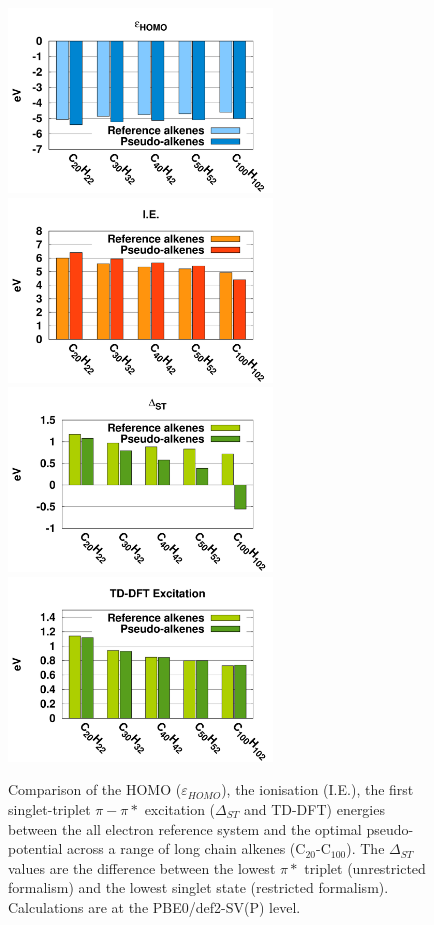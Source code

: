 \documentclass[aip]{revtex4-1}
\begin{document}
\begin{figure}
\begin{center}
\includegraphics[width=7cm]{long_pbe0_homo}
\includegraphics[width=7cm]{long_pbe0_ie}
\includegraphics[width=7cm]{long_pbe0_st}
\includegraphics[width=7cm]{long_pbe0_tddft}
\end{center}

\caption{Comparison of the HOMO ($\varepsilon_{HOMO}$),
the ionisation (I.E.),
the first singlet-triplet $\pi-\pi*$ excitation ($\Delta_{ST}$ and TD-DFT) energies
between the
all electron reference system and the optimal pseudo-potential across a range of long chain alkenes (C\(_{20}\)-C\(_{100}\)).
The $\Delta_{ST}$ values are the difference
between the lowest $\pi*$  triplet (unrestricted formalism) and the lowest singlet state
(restricted formalism).
Calculations are at the PBE0/def2-SV(P) level.}
\label{fig:long_chain_graphs}
\end{figure}
\end{document}
